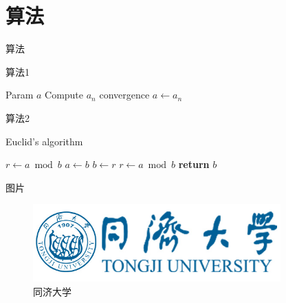 \documentclass[hyperref,UTF8,11pt]{beamer}
\numberwithin{equation}{section} %
\begin{document}

\section{算法}

\begin{frame}{算法}
    \begin{algorithm}[H]
        \caption{算法1}\label{alg:em}
        \begin{algorithmic}[1]
            \Require Param
            \Ensure $a$
            \Repeat
            \State Compute $a_n$
            \Until convergence
            \Return $a\leftarrow a_n$
        \end{algorithmic}
    \end{algorithm} 
\end{frame}

\begin{frame}{算法2}
    \begin{algorithm}[H]
        \caption{Euclid’s algorithm}\label{alg:euclid}
        \begin{algorithmic}[1] %
        \State $r\gets a\bmod b$
        \State $a\gets b$
        \State $b\gets r$
        \State $r\gets a\bmod b$
        \EndWhile\label{alg:euclidendwhile}
        \State \textbf{return} $b$
        \EndProcedure
        \end{algorithmic}
        \end{algorithm}   
\end{frame}

\begin{frame}{图片}
    \begin{figure}
        \centering
        \includegraphics[width=0.85\textwidth]{tj_logo.jpg}
        \caption{同济大学}\label{fig:tj}
    \end{figure}
\end{frame}
\end{document}
